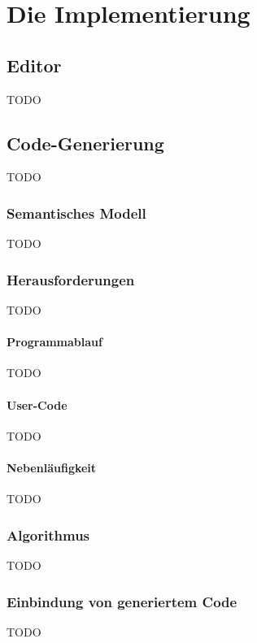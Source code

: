 \chapter{Die Implementierung}
\label{chap:Implementierung}

\section{Editor}
TODO

\section{Code-Generierung}
TODO

\subsection{Semantisches Modell}
TODO

\subsection{Herausforderungen}
TODO

\subsubsection{Programmablauf}
TODO

\subsubsection{User-Code}
TODO

\subsubsection{Nebenläufigkeit}
TODO

\subsection{Algorithmus}
TODO

\subsection{Einbindung von generiertem Code}
TODO